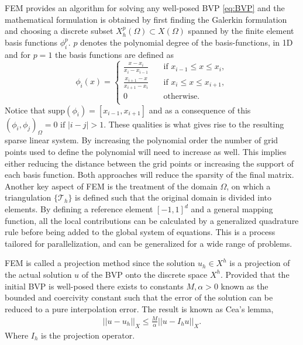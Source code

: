 FEM provides an algorithm for solving any well-posed BVP \ref{eq:BVP} and the mathematical formulation is obtained by first finding the Galerkin
formulation and choosing a discrete subset $X^p_h(\Omega) \subset X(\Omega)$ spanned by the finite element basis functions ${\phi^p_i}$.
$p$ denotes the polynomial degree of the basis-functions, in 1D and for $p=1$ the basis functions are defined as
\[ \phi_i(x) =
    \begin{cases}
        \frac{x-x_i}{x_i-x_{i-1}}  & \quad \text{if } x_{i-1}\leq x \leq x_i, \\
        \frac{x_{i+1}-x}{x_{i+1}-x_i}  & \quad \text{if } x_{i}\leq x \leq x_{i+1}, \\
        0  & \quad \text{otherwise}. \\
    \end{cases}
\]
Notice that $\text{supp}(\phi_i) = [x_{i-1},x_{i+1}]$ and as a consequence of this $(\phi_i,\phi_j)_{\Omega} = 0 \text{ if } |i-j| > 1 $. 
These qualities is what gives rise to the resulting sparse linear system. 
By increasing the polynomial order the number of grid points used to define the polynomial will need to increase as well.
This implies either reducing the distance between the grid points or increasing the support of each basis function.
Both approaches will reduce the sparsity of the final matrix.
Another key aspect of FEM is the treatment of the domain $\Omega$, 
on which a triangulation $\{\mathcal{T}_h\}$ is defined such that the original domain is divided into elements.
By defining a reference element $[-1,1]^d$ and a general mapping function, all the local contributions can be calculated by a 
generalized quadrature rule before being added to the global system of equations. This is a process tailored for parallelization, and can 
be generalized for a wide range of problems.

FEM is called a projection method since the solution $u_h\in X^h$ is a projection
of the actual solution $u$ of the BVP onto the discrete space $X^h$. Provided that the initial BVP is well-posed there exists to 
constants $M,\alpha>0$ known as the bounded and coercivity constant such that the error of the solution can be reduced to a pure 
interpolation error. The result is known as Cea's lemma,  
\begin{align}
    ||u-u_h||_X \leq \frac{M}{\alpha}||u-I_hu||_X.
    \label{eq:Cea}
\end{align}
Where $I_h$ is the projection operator. 

